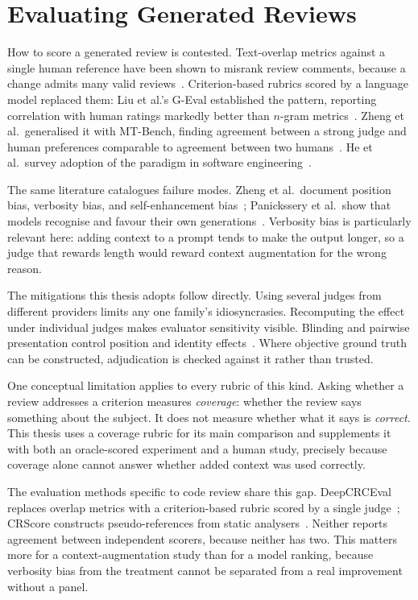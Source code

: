 \section{Evaluating Generated Reviews}
\label{sec:bg-evaluation}

How to score a generated review is contested. Text-overlap metrics against a
single human reference have been shown to misrank review comments, because a
change admits many valid reviews~\cite{hong2024deepcrceval}. Criterion-based
rubrics scored by a language model replaced them: Liu et al.'s G-Eval
established the pattern, reporting correlation with human ratings markedly
better than $n$-gram metrics~\cite{liu2023geval}. Zheng et al.\ generalised it
with MT-Bench, finding agreement between a strong judge and human preferences
comparable to agreement between two humans~\cite{zheng2023judging}. He et al.\
survey adoption of the paradigm in software
engineering~\cite{he2025llmasjudgese}.

The same literature catalogues failure modes. Zheng et al.\ document position
bias, verbosity bias, and self-enhancement bias~\cite{zheng2023judging};
Panickssery et al.\ show that models recognise and favour their own
generations~\cite{panickssery2024selfpreference}. Verbosity bias is
particularly relevant here: adding context to a prompt tends to make the output
longer, so a judge that rewards length would reward context augmentation for the
wrong reason.

The mitigations this thesis adopts follow directly. Using several judges from
different providers limits any one family's idiosyncrasies. Recomputing the
effect under individual judges makes evaluator sensitivity visible. Blinding
and pairwise presentation control position and identity
effects~\cite{chiang2024chatbotarena}. Where objective ground truth can be
constructed, adjudication is checked against it rather than trusted.

One conceptual limitation applies to every rubric of this kind. Asking whether
a review addresses a criterion measures \emph{coverage}: whether the review
says something about the subject. It does not measure whether what it says is
\emph{correct}. This thesis uses a coverage rubric for its main comparison and
supplements it with both an oracle-scored experiment and a human study,
precisely because coverage alone cannot answer whether added context was used
correctly.

The evaluation methods specific to code review share this gap. DeepCRCEval
replaces overlap metrics with a criterion-based rubric scored by a single
judge~\cite{hong2024deepcrceval}; CRScore constructs pseudo-references from
static analysers~\cite{naik2025crscore}. Neither reports agreement between
independent scorers, because neither has two. This matters more for a
context-augmentation study than for a model ranking, because verbosity bias
from the treatment cannot be separated from a real improvement without a panel.
